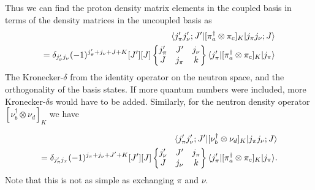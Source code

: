 Thus we can find the proton density matrix elements in the coupled basis in terms of 
the density matrices in the uncoupled basis as
\begin{equation}\label{eq.tensor}\begin{split}
\langle j_{\pi}'j_{\nu}';J'|[\pi_a^{\dagger}\otimes \pi_c]_K|j_{\pi}j_{\nu};J\rangle \\
= \delta_{j_{\nu}'j_{\nu}}(-1)^{j_{\pi}'+j_{\nu}+J+K}[J'][J]
\begin{Bmatrix} 
j_{\pi}' & J' & j_{\nu} \\ 
J & j_{\pi} & k
\end{Bmatrix}
\langle j_{\pi}'|[\pi_a^{\dagger}\otimes \pi_c]_K|j_{\pi}\rangle
\end{split}\end{equation}
The Kronecker-$\delta$ from the identity operator on the neutron space, 
and the orthogonality of the basis states. If more quantum numbers were included,
more Kronecker-$\delta$s would have to be added. Similarly, for the neutron density 
operator $[\nu_b^{\dagger}\otimes \nu_d]_K$ we have

\begin{equation}\label{eq.tensor2}\begin{split}
\langle j_{\pi}'j_{\nu}';J'|[\nu_b^{\dagger}\otimes \nu_d]_K|j_{\pi}j_{\nu};J\rangle \\
= \delta_{j_{\pi}'j_{\pi}}(-1)^{j_{\pi}+j_{\nu}+J'+K}[J'][J]
\begin{Bmatrix} 
j_{\nu}' & J' & j_{\pi} \\ 
J & j_{\nu} & k
\end{Bmatrix}
\langle j_{\pi}'|[\pi_a^{\dagger}\otimes \pi_c]_K|j_{\pi}\rangle.
\end{split}
\end{equation}
Note that this is not as simple as exchanging $\pi$ and $\nu$.

